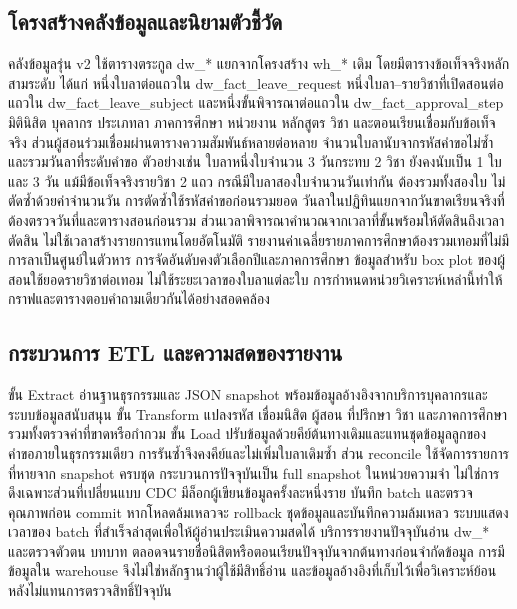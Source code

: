 \subsection{โครงสร้างคลังข้อมูลและนิยามตัวชี้วัด}
คลังข้อมูลรุ่น v2 ใช้ตารางตระกูล dw\_* แยกจากโครงสร้าง wh\_* เดิม โดยมีตารางข้อเท็จจริงหลักสามระดับ ได้แก่ หนึ่งใบลาต่อแถวใน dw\_fact\_leave\_request หนึ่งใบลา--รายวิชาที่เปิดสอนต่อแถวใน dw\_fact\_leave\_subject และหนึ่งขั้นพิจารณาต่อแถวใน dw\_fact\_approval\_step มิตินิสิต บุคลากร ประเภทลา ภาคการศึกษา หน่วยงาน หลักสูตร วิชา และตอนเรียนเชื่อมกับข้อเท็จจริง ส่วนผู้สอนร่วมเชื่อมผ่านตารางความสัมพันธ์หลายต่อหลาย
จำนวนใบลานับจากรหัสคำขอไม่ซ้ำและรวมวันลาที่ระดับคำขอ ตัวอย่างเช่น ใบลาหนึ่งใบจำนวน 3 วันกระทบ 2 วิชา ยังคงนับเป็น 1 ใบและ 3 วัน แม้มีข้อเท็จจริงรายวิชา 2 แถว กรณีมีใบลาสองใบจำนวนวันเท่ากัน ต้องรวมทั้งสองใบ ไม่ตัดซ้ำด้วยค่าจำนวนวัน การตัดซ้ำใช้รหัสคำขอก่อนรวมยอด วันลาในปฏิทินแยกจากวันขาดเรียนจริงที่ต้องตรวจวันที่และตารางสอนก่อนรวม ส่วนเวลาพิจารณาคำนวณจากเวลาที่ขั้นพร้อมให้ตัดสินถึงเวลาตัดสิน ไม่ใช้เวลาสร้างรายการแทนโดยอัตโนมัติ
รายงานค่าเฉลี่ยรายภาคการศึกษาต้องรวมเทอมที่ไม่มีการลาเป็นศูนย์ในตัวหาร การจัดอันดับคงตัวเลือกปีและภาคการศึกษา ข้อมูลสำหรับ box plot ของผู้สอนใช้ยอดรายวิชาต่อเทอม ไม่ใช้ระยะเวลาของใบลาแต่ละใบ การกำหนดหน่วยวิเคราะห์เหล่านี้ทำให้กราฟและตารางตอบคำถามเดียวกันได้อย่างสอดคล้อง
\subsection{กระบวนการ ETL และความสดของรายงาน}
ขั้น Extract อ่านฐานธุรกรรมและ JSON snapshot พร้อมข้อมูลอ้างอิงจากบริการบุคลากรและ ระบบข้อมูลสนับสนุน ขั้น Transform แปลงรหัส เชื่อมนิสิต ผู้สอน ที่ปรึกษา วิชา และภาคการศึกษา รวมทั้งตรวจค่าที่ขาดหรือกำกวม ขั้น Load ปรับข้อมูลด้วยคีย์ต้นทางเดิมและแทนชุดข้อมูลลูกของคำขอภายในธุรกรรมเดียว การรันซ้ำจึงคงคีย์และไม่เพิ่มใบลาเดิมซ้ำ ส่วน reconcile ใช้จัดการรายการที่หายจาก snapshot ครบชุด
กระบวนการปัจจุบันเป็น full snapshot ในหน่วยความจำ ไม่ใช่การดึงเฉพาะส่วนที่เปลี่ยนแบบ CDC มีล็อกผู้เขียนข้อมูลครั้งละหนึ่งราย บันทึก batch และตรวจคุณภาพก่อน commit หากโหลดล้มเหลวจะ rollback ชุดข้อมูลและบันทึกความล้มเหลว ระบบแสดงเวลาของ batch ที่สำเร็จล่าสุดเพื่อให้ผู้อ่านประเมินความสดได้
บริการรายงานปัจจุบันอ่าน dw\_* และตรวจตัวตน บทบาท ตลอดจนรายชื่อนิสิตหรือตอนเรียนปัจจุบันจากต้นทางก่อนจำกัดข้อมูล การมีข้อมูลใน warehouse จึงไม่ใช่หลักฐานว่าผู้ใช้มีสิทธิ์อ่าน และข้อมูลอ้างอิงที่เก็บไว้เพื่อวิเคราะห์ย้อนหลังไม่แทนการตรวจสิทธิ์ปัจจุบัน
